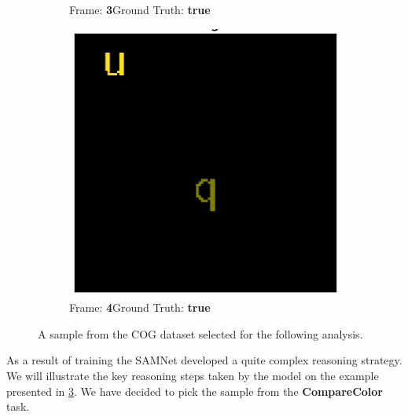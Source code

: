 \begin{figure}[htbp]
\begin{subfigure}{0.25\textwidth}
		\caption{Frame: \textbf{3}\newline Ground Truth: \textbf{true}}
		\label{fig:frame-3}
	\end{subfigure}%
	\hfill
	\begin{subfigure}{0.25\textwidth}
		\centering
		\includegraphics[width=0.9\linewidth]{"../img/visualization/experiment_run_20190917_022319/Frame 4"}
		\caption{Frame: \textbf{4}\newline Ground Truth: \textbf{true}}
		\label{fig:frame-4}
	\end{subfigure}%
	\hfill\null
	\newline
	\centering
	\caption{A sample from the COG dataset selected for the following analysis.} 
	\label{fig:example-app}  
\end{figure}


As a result of training the SAMNet developed a quite complex reasoning strategy.
We will illustrate the key reasoning steps taken by the model on the example presented in \cref{fig:example-app}.
We have decided to pick the sample from the \textbf{CompareColor} task.	

